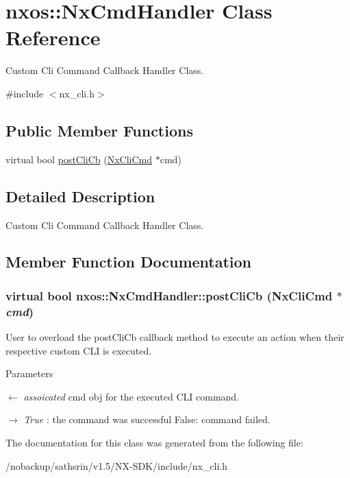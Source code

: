 \hypertarget{classnxos_1_1NxCmdHandler}{
\section{nxos::NxCmdHandler Class Reference}
\label{classnxos_1_1NxCmdHandler}
}


Custom Cli Command Callback Handler Class.  


{\ttfamily \#include $<$nx\_\-cli.h$>$}\subsection*{Public Member Functions}
\begin{DoxyCompactItemize}
\item 
virtual bool \hyperlink{classnxos_1_1NxCmdHandler_ab60a4672e08b1acd1faa249936963ead}{postCliCb} (\hyperlink{classnxos_1_1NxCliCmd}{NxCliCmd} $\ast$cmd)
\end{DoxyCompactItemize}


\subsection{Detailed Description}
Custom Cli Command Callback Handler Class. 

\subsection{Member Function Documentation}
\hypertarget{classnxos_1_1NxCmdHandler_ab60a4672e08b1acd1faa249936963ead}{
\subsubsection[{postCliCb}]{\setlength{\rightskip}{0pt plus 5cm}virtual bool nxos::NxCmdHandler::postCliCb ({\bf NxCliCmd} $\ast$ {\em cmd})}}
\label{classnxos_1_1NxCmdHandler_ab60a4672e08b1acd1faa249936963ead}
User to overload the postCliCb callback method to execute an action when their respective custom CLI is executed. 
\begin{DoxyParams}{Parameters}
\item[\mbox{$\leftarrow$} {\em assoicated}]cmd obj for the executed CLI command. \item[\mbox{$\rightarrow$} {\em True}]: the command was successful False: command failed. \end{DoxyParams}


The documentation for this class was generated from the following file:\begin{DoxyCompactItemize}
\item 
/nobackup/sathsrin/v1.5/NX-\/SDK/include/nx\_\-cli.h\end{DoxyCompactItemize}
